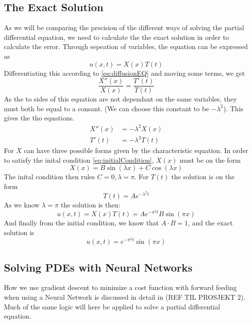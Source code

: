 \subsection{The Exact Solution}
As we will be comparing the precision of the different ways of solving the partial differential equation, we need to calculate the the exact solution in order to calculate the error.
Through sepeation of variables, the equation can be expressed as
\begin{equation}
    u(x,t) = X(x)T(t)
    \label{eq:separated}
\end{equation}
Differentiating this according to \eqref{eq:diffusionEQ} and moving some terms, we get
\begin{equation*}
    \frac{X''(x)}{X(x)} = \frac{T'(t)}{T(t)}
\end{equation*}
As the to sides of this equation are not dependant on the same variables, they must both be equal to a consant. (We can choose this constant to be $-\lambda ^2$). This gives the tho equations.
\begin{equation*}
    \begin{split}
        X''(x) &= -\lambda ^2 X(x) \\
        T'(t) &= -\lambda^2 T(t)
    \end{split}
\end{equation*}
For $X$ can have three possible forms given by the characteristic equation. In order to satisfy the inital condition \eqref{eq:initialCondition}, $X(x)$ must be on the form
\begin{equation*}
    X(x) = B\sin(\lambda x) + C\cos(\lambda x)
\end{equation*}
The inital condition then rules $C=0, \lambda = \pi$. For $T(t)$ the solution is on the form
\begin{equation*}
    T(t) = Ae^{-\lambda^2t}
\end{equation*}
As we know $\lambda =\pi$ the solution is then:
\begin{equation*}
    u(x,t) = X(x)T(t) = Ae^{-\pi^2 t}B\sin(\pi x)
\end{equation*}
And finally from the initial condition, we know that $A\cdot B = 1$, and the exact solution is
\begin{equation}
    u(x,t) = e^{-\pi^2 t}\sin(\pi x)
    \label{eq:exact}
\end{equation}

\subsection{Solving PDEs with Neural Networks}
How we use gradient descent to minimize a cost function with forward feeding when using a Neural Network is discussed in detail in (REF TIL PROSJEKT 2). Much of the same logic will here be applied to solve a partial differential equation.

